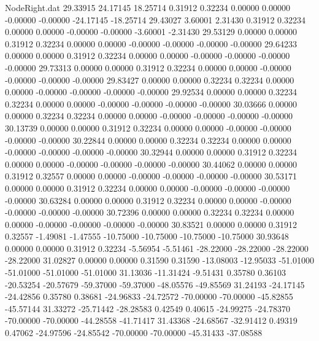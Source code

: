\begin{filecontents}{NodeRight.dat}
  29.33915   24.17145   18.25714     0.31912    0.32234    0.00000    0.00000   -0.00000   -0.00000  -24.17145  -18.25714
  29.43027    3.60001    2.31430     0.31912    0.32234    0.00000    0.00000   -0.00000   -0.00000   -3.60001   -2.31430
  29.53129    0.00000    0.00000     0.31912    0.32234    0.00000    0.00000   -0.00000   -0.00000   -0.00000   -0.00000
  29.64233    0.00000    0.00000     0.31912    0.32234    0.00000    0.00000   -0.00000   -0.00000   -0.00000   -0.00000
  29.73313    0.00000    0.00000     0.31912    0.32234    0.00000    0.00000   -0.00000   -0.00000   -0.00000   -0.00000
  29.83427    0.00000    0.00000     0.32234    0.32234    0.00000    0.00000   -0.00000   -0.00000   -0.00000   -0.00000
  29.92534    0.00000    0.00000     0.32234    0.32234    0.00000    0.00000   -0.00000   -0.00000   -0.00000   -0.00000
  30.03666    0.00000    0.00000     0.32234    0.32234    0.00000    0.00000   -0.00000   -0.00000   -0.00000   -0.00000
  30.13739    0.00000    0.00000     0.31912    0.32234    0.00000    0.00000   -0.00000   -0.00000   -0.00000   -0.00000
  30.22844    0.00000    0.00000     0.32234    0.32234    0.00000    0.00000   -0.00000   -0.00000   -0.00000   -0.00000
  30.32944    0.00000    0.00000     0.31912    0.32234    0.00000    0.00000   -0.00000   -0.00000   -0.00000   -0.00000
  30.44062    0.00000    0.00000     0.31912    0.32557    0.00000    0.00000   -0.00000   -0.00000   -0.00000   -0.00000
  30.53171    0.00000    0.00000     0.31912    0.32234    0.00000    0.00000   -0.00000   -0.00000   -0.00000   -0.00000
  30.63284    0.00000    0.00000     0.31912    0.32234    0.00000    0.00000   -0.00000   -0.00000   -0.00000   -0.00000
  30.72396    0.00000    0.00000     0.32234    0.32234    0.00000    0.00000   -0.00000   -0.00000   -0.00000   -0.00000
  30.83521    0.00000    0.00000     0.31912    0.32557   -1.49081   -1.47555  -10.75000  -10.75000  -10.75000  -10.75000
  30.93648    0.00000    0.00000     0.31912    0.32234   -5.56954   -5.51461  -28.22000  -28.22000  -28.22000  -28.22000
  31.02827    0.00000    0.00000     0.31590    0.31590  -13.08003  -12.95033  -51.01000  -51.01000  -51.01000  -51.01000
  31.13036  -11.31424   -9.51431     0.35780    0.36103  -20.53254  -20.57679  -59.37000  -59.37000  -48.05576  -49.85569
  31.24193  -24.17145  -24.42856     0.35780    0.38681  -24.96833  -24.72572  -70.00000  -70.00000  -45.82855  -45.57144
  31.33272  -25.71442  -28.28583     0.42549    0.40615  -24.99275  -24.78370  -70.00000  -70.00000  -44.28558  -41.71417
  31.43368  -24.68567  -32.91412     0.49319    0.47062  -24.97596  -24.85542  -70.00000  -70.00000  -45.31433  -37.08588

\end{filecontents}
